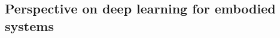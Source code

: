 \documentclass[12pt, a4paper]{article}
\newcommand{\redtext}[1]{\textcolor{red}{#1}}
\begin{document}
\subsection*{Perspective on deep learning for embodied systems}

\end{document}

